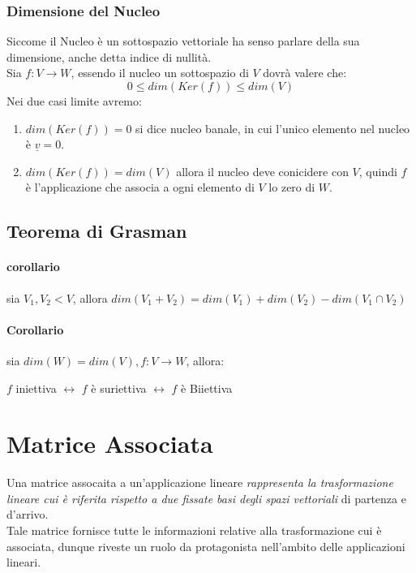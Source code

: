 \subsubsection{Dimensione del Nucleo}
Siccome il Nucleo è un sottospazio vettoriale ha senso parlare della sua dimensione, anche detta indice di nullità.
\\Sia $f:V\to W$, essendo il nucleo un sottospazio di $V$ dovrà valere che:
\[ 0 \leq dim(Ker(f)) \leq dim(V) \]
Nei due casi limite avremo:
\begin{enumerate}
	\item $dim(Ker(f)) = 0$ si dice nucleo banale, in cui l'unico elemento nel nucleo è $\underline{v}=0$.
	\item $dim(Ker(f)) = dim(V)$ allora il nucleo deve conicidere con $V$, quindi $f$ è l'applicazione che associa a ogni elemento di $V$ lo zero di $W$.
\end{enumerate}




\subsection{Teorema di Grasman}
\paragraph{corollario} sia $V_1,V_2<V$, allora $dim(V_1+V_2)=dim(V_1) + dim(V_2) - dim(V_1 \cap V_2)$

\paragraph{Corollario} sia $dim(W)=dim(V), f:V\to W$, allora:
\begin{center}
	$f$ iniettiva $\leftrightarrow$ $f$ è suriettiva $\leftrightarrow$ $f$ è Biiettiva
\end{center}

\section{Matrice Associata}
Una matrice assocaita a un'applicazione lineare \emph{rappresenta la trasformazione lineare cui è riferita rispetto a due fissate basi degli spazi vettoriali} di partenza e d'arrivo.
\\Tale matrice fornisce tutte le informazioni relative alla trasformazione cui è associata, dunque riveste un ruolo da protagonista nell'ambito delle applicazioni lineari.

